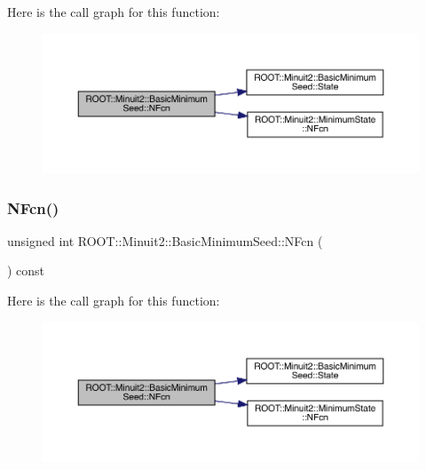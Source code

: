 Here is the call graph for this function\+:
\nopagebreak
\begin{figure}[H]
\begin{center}
\leavevmode
\includegraphics[width=350pt]{de/d50/classROOT_1_1Minuit2_1_1BasicMinimumSeed_a1d34718bf163936432ef05dea799c469_cgraph}
\end{center}
\end{figure}
\mbox{\label{classROOT_1_1Minuit2_1_1BasicMinimumSeed_a1d34718bf163936432ef05dea799c469}} 
\subsubsection{\texorpdfstring{NFcn()}{NFcn()}\hspace{0.1cm}{\footnotesize\ttfamily [2/2]}}
{\footnotesize\ttfamily unsigned int R\+O\+O\+T\+::\+Minuit2\+::\+Basic\+Minimum\+Seed\+::\+N\+Fcn (\begin{DoxyParamCaption}{ }\end{DoxyParamCaption}) const\hspace{0.3cm}{\ttfamily [inline]}}

Here is the call graph for this function\+:
\nopagebreak
\begin{figure}[H]
\begin{center}
\leavevmode
\includegraphics[width=350pt]{de/d50/classROOT_1_1Minuit2_1_1BasicMinimumSeed_a1d34718bf163936432ef05dea799c469_cgraph}
\end{center}
\end{figure}
\mbox{\label{classROOT_1_1Minuit2_1_1BasicMinimumSeed_ae2af98f9f03cfe5e5202153b914ff120}} 
